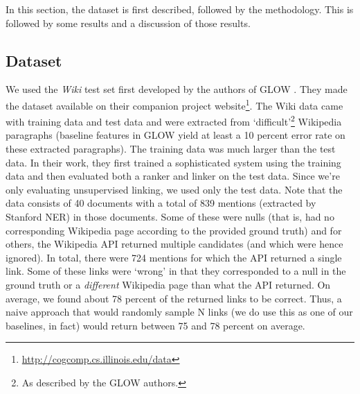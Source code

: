 
In this section, the dataset is first described, followed by the methodology. This is followed by some results and a discussion of those results. 
\subsection{Dataset}
We used the \emph{Wiki} test set first developed by the authors of GLOW \cite{roth}. They made the dataset available on their companion project website\footnote{\url{http://cogcomp.cs.illinois.edu/data}}. The Wiki data came with training data and test data and were extracted from `difficult'\footnote{As described by the GLOW authors.} Wikipedia paragraphs (baseline features in GLOW yield at least a 10 percent error rate on these extracted paragraphs). The training data was much larger than the test data. In their work, they first trained a sophisticated system using the training data and then evaluated both a ranker and linker on the test data. Since we're only evaluating unsupervised linking, we used only the test data. Note that the data consists of 40 documents with a total of 839 mentions (extracted by Stanford NER) in those documents. Some of these were nulls (that is, had no corresponding Wikipedia page according to the provided ground truth) and for others, the Wikipedia API returned multiple candidates (and which were hence ignored). In total, there were 724 mentions for which the API returned a single link. Some of these links were `wrong' in that they corresponded to a null in the ground truth or a \emph{different} Wikipedia page than what the API returned. On average, we found about 78 percent of the returned links to be correct. Thus, a naive approach that would randomly sample N links (we do use this as one of our baselines, in fact) would return between 75 and 78 percent on average.   
